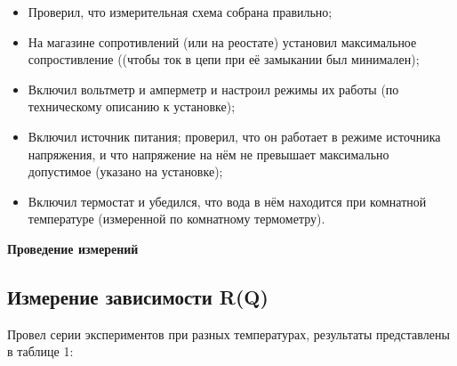 \hspace{2cm}\begin{minipage}[t]{15cm}
\begin{itemize}
    \item Проверил, что измерительная схема собрана правильно;
    
    \item На магазине сопротивлений (или на реостате) установил максимальное сопростивление  ((чтобы ток в цепи при её замыкании был минимален);
    
    \item Включил вольтметр и амперметр и настроил режимы их работы (по техническому описанию к установке);

    \item Включил источник питания; проверил, что он работает в режиме источника напряжения, и что напряжение на нём не превышает максимально допустимое (указано на установке);
    
    \item Включил термостат и убедился, что вода в нём находится при комнатной температуре (измеренной по комнатному термометру).
    
\end{itemize}
\end{minipage}

\newpage

\begin{center}
    {\Large\bf Проведение измерений}
\end{center}

\subsection{Измерение зависимости R(Q)}
Провел серии экспериментов при разных температурах, результаты представлены в таблице 1:


